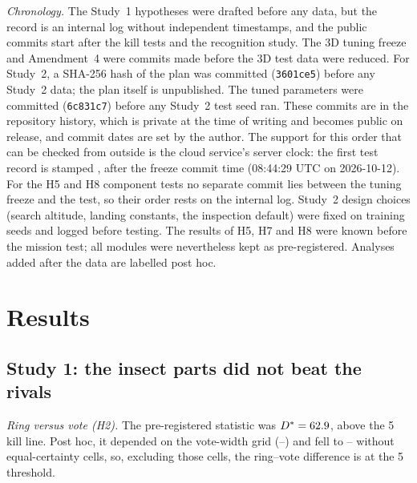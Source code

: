 \documentclass[10pt,twocolumn]{article}
\begin{document}
\emph{Chronology.} The Study~1 hypotheses were drafted before any data, but the record is an internal log without independent timestamps, and the public commits start after the kill tests and the recognition study. The 3D tuning freeze and Amendment~4 were commits made before the 3D test data were reduced. For Study~2, a SHA-256 hash of the plan was committed (\texttt{3601ce5}) before any Study~2 data; the plan itself is unpublished. The tuned parameters were committed (\texttt{6c831c7}) before any Study~2 test seed ran. These commits are in the repository history, which is private at the time of writing and becomes public on release, and commit dates are set by the author. The support for this order that can be checked from outside is the cloud service's server clock: the first test record is stamped \StwoFirstRow, after the freeze commit time (08:44:29 UTC on 2026-10-12). For the H5 and H8 component tests no separate commit lies between the tuning freeze and the test, so their order rests on the internal log. Study~2 design choices (search altitude, landing constants, the inspection default) were fixed on training seeds and logged before testing. The results of H5, H7 and H8 were known before the mission test; all modules were nevertheless kept as pre-registered. Analyses added after the data are labelled post hoc.

\section{Results}

\subsection{Study 1: the insect parts did not beat the rivals}\label{sec:s1}
\emph{Ring versus vote (H2).} The pre-registered statistic was $D^*=62.9$\textdegree, above the 5\textdegree{} kill line. Post hoc, it depended on the vote-width grid (\SoneDstarFine--\SoneDstar\textdegree) and fell to \SoneDstarExclLo--\SoneDstarExclHi\textdegree{} without equal-certainty cells, so, excluding those cells, the ring--vote difference is at the 5\textdegree{} threshold.
\end{document}

